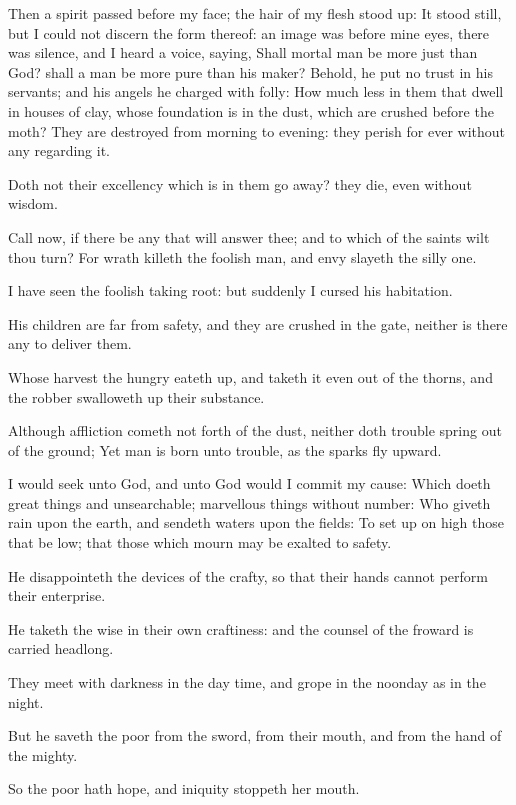 \Verse Then a spirit passed before my face; the hair of my flesh stood up: \Verse It stood still, but I could not discern the form thereof: an image was before mine eyes, there was silence, and I heard a voice, saying, \Verse Shall mortal man be more just than God? shall a man be more pure than his maker?  \Verse Behold, he put no trust in his servants; and his angels he charged with folly: \Verse How much less in them that dwell in houses of clay, whose foundation is in the dust, which are crushed before the moth?  \Verse They are destroyed from morning to evening: they perish for ever without any regarding it.

\Verse Doth not their excellency which is in them go away? they die, even without wisdom.


\Chapter
\Verse Call now, if there be any that will answer thee; and to which of the saints wilt thou turn?  \Verse For wrath killeth the foolish man, and envy slayeth the silly one.

\Verse I have seen the foolish taking root: but suddenly I cursed his habitation.

\Verse His children are far from safety, and they are crushed in the gate, neither is there any to deliver them.

\Verse Whose harvest the hungry eateth up, and taketh it even out of the thorns, and the robber swalloweth up their substance.

\Verse Although affliction cometh not forth of the dust, neither doth trouble spring out of the ground; \Verse Yet man is born unto trouble, as the sparks fly upward.

\Verse I would seek unto God, and unto God would I commit my cause: \Verse Which doeth great things and unsearchable; marvellous things without number: \Verse Who giveth rain upon the earth, and sendeth waters upon the fields: \Verse To set up on high those that be low; that those which mourn may be exalted to safety.

\Verse He disappointeth the devices of the crafty, so that their hands cannot perform their enterprise.

\Verse He taketh the wise in their own craftiness: and the counsel of the froward is carried headlong.

\Verse They meet with darkness in the day time, and grope in the noonday as in the night.

\Verse But he saveth the poor from the sword, from their mouth, and from the hand of the mighty.

\Verse So the poor hath hope, and iniquity stoppeth her mouth.

